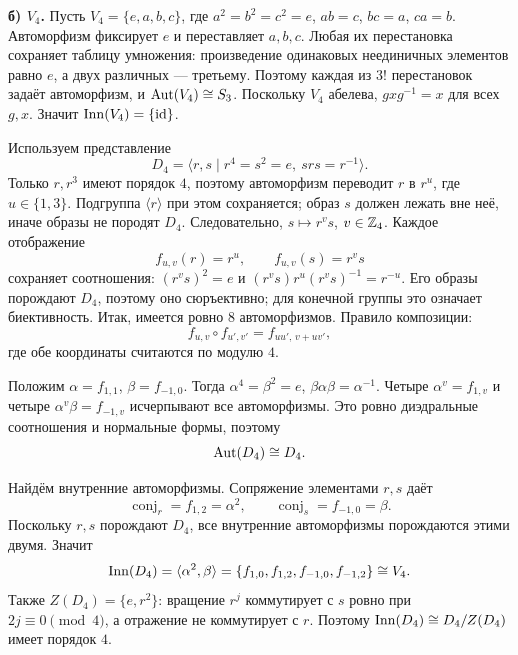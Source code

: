 \textbf{б) $V_4$.}
Пусть $V_4=\{e,a,b,c\}$, где
$a^2=b^2=c^2=e$, $ab=c$, $bc=a$, $ca=b$.
Автоморфизм фиксирует $e$ и переставляет $a,b,c$.
Любая их перестановка сохраняет таблицу умножения:
произведение одинаковых неединичных элементов равно $e$,
а двух различных --- третьему. Поэтому каждая из $3!$ перестановок
задаёт автоморфизм, и $\operatorname{Aut}(V_4)\cong S_3$.
Поскольку $V_4$ абелева, $gxg^{-1}=x$ для всех $g,x$.
Значит $\operatorname{Inn}(V_4)=\{\operatorname{id}\}$.

Используем представление
\[D_4=\langle r,s\mid r^4=s^2=e,\ srs=r^{-1}\rangle.\]
Только $r,r^3$ имеют порядок $4$, поэтому автоморфизм переводит
$r$ в $r^u$, где $u\in\{1,3\}$.
Подгруппа $\langle r\rangle$ при этом сохраняется;
образ $s$ должен лежать вне неё, иначе образы не породят $D_4$.
Следовательно, $s\mapsto r^v s$, $v\in\mathbb{Z}_4$.
Каждое отображение
\[f_{u,v}(r)=r^u,\qquad f_{u,v}(s)=r^v s\]
сохраняет соотношения: $(r^v s)^2=e$ и
$(r^v s)r^u(r^v s)^{-1}=r^{-u}$.
Его образы порождают $D_4$, поэтому оно сюръективно;
для конечной группы это означает биективность.
Итак, имеется ровно $8$ автоморфизмов. Правило композиции:
\[f_{u,v}\circ f_{u',v'}=f_{uu',\,v+uv'},\]
где обе координаты считаются по модулю $4$.

Положим $\alpha=f_{1,1}$, $\beta=f_{-1,0}$.
Тогда $\alpha^4=\beta^2=e$, $\beta\alpha\beta=\alpha^{-1}$.
Четыре $\alpha^v=f_{1,v}$ и четыре $\alpha^v\beta=f_{-1,v}$
исчерпывают все автоморфизмы.
Это ровно диэдральные соотношения и нормальные формы, поэтому
\[\operatorname{Aut}(D_4)\cong D_4.\]

Найдём внутренние автоморфизмы. Сопряжение элементами $r,s$ даёт
\[\operatorname{conj}_r=f_{1,2}=\alpha^2,\qquad
 \operatorname{conj}_s=f_{-1,0}=\beta.\]
Поскольку $r,s$ порождают $D_4$, все внутренние автоморфизмы
порождаются этими двумя. Значит
\[\operatorname{Inn}(D_4)=\langle\alpha^2,\beta\rangle
 =\{f_{1,0},f_{1,2},f_{-1,0},f_{-1,2}\}\cong V_4.\]
Также $Z(D_4)=\{e,r^2\}$: вращение $r^j$ коммутирует с $s$
ровно при $2j\equiv0\pmod4$, а отражение не коммутирует с $r$.
Поэтому $\operatorname{Inn}(D_4)\cong D_4/Z(D_4)$ имеет порядок $4$.
